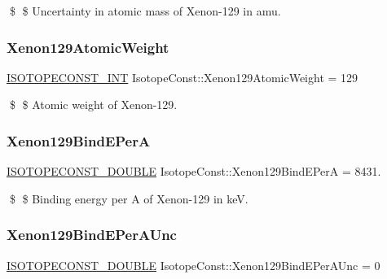 \$ \$ Uncertainty in atomic mass of Xenon-\/129 in amu. \mbox{\label{group___isotope_const-_xenon-_xe129_ga621e18047763aa7f6eeb7a92522202e1}} 
\subsubsection{\texorpdfstring{Xenon129\+Atomic\+Weight}{Xenon129AtomicWeight}}
{\footnotesize\ttfamily \mbox{\hyperlink{group___isotope_const-_macros_ga5f18360b3e99483a35c32d789e62621c}{I\+S\+O\+T\+O\+P\+E\+C\+O\+N\+S\+T\+\_\+\+I\+NT}} Isotope\+Const\+::\+Xenon129\+Atomic\+Weight = 129}

\$ \$ Atomic weight of Xenon-\/129. \mbox{\label{group___isotope_const-_xenon-_xe129_gaec1b8de3394fff732d6ec5d66d4aae8f}} 
\subsubsection{\texorpdfstring{Xenon129\+Bind\+E\+PerA}{Xenon129BindEPerA}}
{\footnotesize\ttfamily \mbox{\hyperlink{group___isotope_const-_macros_ga8f45a7272ce02c0b4c65c44636ed719a}{I\+S\+O\+T\+O\+P\+E\+C\+O\+N\+S\+T\+\_\+\+D\+O\+U\+B\+LE}} Isotope\+Const\+::\+Xenon129\+Bind\+E\+PerA = 8431.}

\$ \$ Binding energy per A of Xenon-\/129 in keV. \mbox{\label{group___isotope_const-_xenon-_xe129_ga6e963e4dbe2892460d93f32442254c46}} 
\subsubsection{\texorpdfstring{Xenon129\+Bind\+E\+Per\+A\+Unc}{Xenon129BindEPerAUnc}}
{\footnotesize\ttfamily \mbox{\hyperlink{group___isotope_const-_macros_ga8f45a7272ce02c0b4c65c44636ed719a}{I\+S\+O\+T\+O\+P\+E\+C\+O\+N\+S\+T\+\_\+\+D\+O\+U\+B\+LE}} Isotope\+Const\+::\+Xenon129\+Bind\+E\+Per\+A\+Unc = 0}

